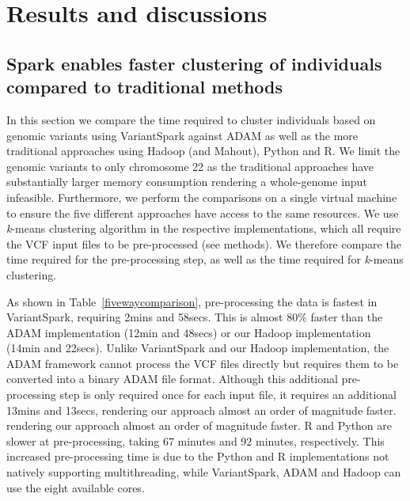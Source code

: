 \documentclass{bmcart}
\newcommand{\variantSpark}{{\sc VariantSpark}}
\newcommand{\kMeans}{\textit{k}-means}
\begin{document}
\section*{Results and discussions}

\subsection*{{\sc Spark} enables faster clustering of individuals compared to traditional methods}

In this section we compare the time required to cluster individuals based on genomic variants using \variantSpark{} against ADAM as well as the more traditional approaches using Hadoop (and Mahout), Python and R. 
We limit the genomic variants to only chromosome 22 as the traditional approaches have substantially larger memory consumption rendering a whole-genome input infeasible.  
Furthermore, we perform the comparisons on a single virtual machine to ensure the five different approaches have access to the same resources.
We use \kMeans{} clustering algorithm in the respective implementations, which all require the VCF input files to be pre-processed (see methods). 
We therefore compare the time required for the pre-processing step, as well as the time required for \kMeans{} clustering.

As shown in Table~\ref{fivewaycomparison}, pre-processing the data is fastest in \variantSpark{}, requiring 2mins and 58secs. %
This is almost 80\% faster than the ADAM implementation (12min and 48secs) %
or our Hadoop implementation (14min and 22secs). %
Unlike \variantSpark{} and our Hadoop implementation, the ADAM framework cannot process the VCF files directly but requires them to be converted into a binary ADAM file format. 
Although this additional pre-processing step is only required once for each input file, it requires an additional 13mins and 13secs, %
rendering our approach almost an order of magnitude faster. 
rendering our approach almost an order of magnitude faster. 
R and Python are slower at pre-processing, taking 67 minutes and 92 minutes, respectively. This increased pre-processing time is due to the Python and R implementations not natively supporting multithreading, while \variantSpark{}, ADAM and Hadoop can use the eight available cores.
\end{document}
